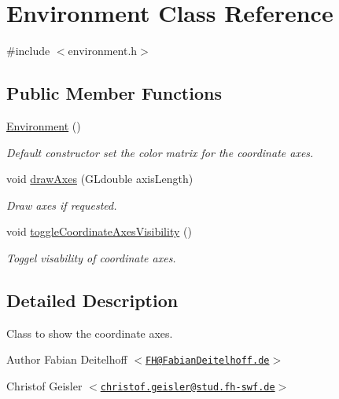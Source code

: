 \hypertarget{classEnvironment}{
\section{\-Environment \-Class \-Reference}
\label{d0/d98/classEnvironment}
}


{\ttfamily \#include $<$environment.\-h$>$}

\subsection*{\-Public \-Member \-Functions}
\begin{DoxyCompactItemize}
\item 
\hyperlink{classEnvironment_a8b427c4448d8b7536666837521b9e83d}{\-Environment} ()
\begin{DoxyCompactList}\small\item\em \-Default constructor set the color matrix for the coordinate axes. \end{DoxyCompactList}\item 
void \hyperlink{classEnvironment_aec8782b0e0548ff5b18091b2468edda3}{draw\-Axes} (\-G\-Ldouble axis\-Length)
\begin{DoxyCompactList}\small\item\em \-Draw axes if requested. \end{DoxyCompactList}\item 
void \hyperlink{classEnvironment_a4cba1d0fd57a2e197079410e96414c07}{toggle\-Coordinate\-Axes\-Visibility} ()
\begin{DoxyCompactList}\small\item\em \-Toggel visability of coordinate axes. \end{DoxyCompactList}\end{DoxyCompactItemize}


\subsection{\-Detailed \-Description}
\-Class to show the coordinate axes.

\begin{DoxyAuthor}{\-Author}
\-Fabian \-Deitelhoff $<$\href{mailto:FH@FabianDeitelhoff.de}{\tt \-F\-H@\-Fabian\-Deitelhoff.\-de}$>$ 

\-Christof \-Geisler $<$\href{mailto:christof.geisler@stud.fh-swf.de}{\tt christof.\-geisler@stud.\-fh-\/swf.\-de}$>$ 
\end{DoxyAuthor}


